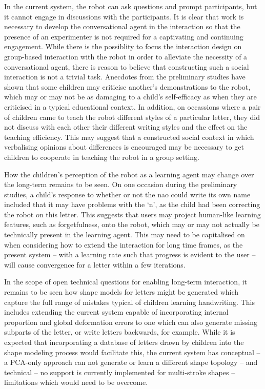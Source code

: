 \documentclass{sig-alternate}
\begin{document}
In the current system, the robot can ask questions and prompt participants, but it 
cannot engage in discussions with the participants. It is clear that work is necessary 
to develop the conversational agent in the interaction so that the presence of an 
experimenter is not required for a captivating and continuing engagement. While there is the 
possiblity to focus the interaction design on group-based interaction with the robot 
in order to alleviate the necessity of a conversational agent, there is reason to 
believe that constructing such a social interaction is not a trivial task. Anecdotes 
from the preliminary studies have shown that some children may criticise another's 
demonstrations to the robot, which may or may not be as damaging to a child's 
self-efficacy as when they are criticised in a typical educational context. In addition,
on occassions where a pair of children came to teach the robot different styles of a 
particular letter, they did not discuss with each other their different writing styles 
and the effect on the teaching efficiency. This may suggest that a constructed social context in 
which verbalising opinions about differences is encouraged may be necessary to get children 
to cooperate in teaching the robot in a group setting.  

How the children's perception of the robot as a learning agent may change over the 
long-term remains to be seen. On one occasion during the preliminary studies, a 
child's response to whether or not the {\sc nao} could write its own name included that it 
may have problems with the `n', as the child had been correcting the robot on this 
letter. This suggests that users may project human-like learning features, such as 
forgetfulness, onto the robot, which may or may not actually be technically present 
in the learning agent. This may need to be capitalised on when considering how to 
extend the interaction for long time frames, as the present system -- with a learning rate 
such that progress is evident to the user -- will cause convergence for a letter within a 
few iterations.

In the scope of open technical questions for enabling long-term interaction, it remains to be seen how shape models
for letters might be generated which capture the full range of mistakes typical
of children learning handwriting. This includes extending the current system capable of
incorporating internal proportion and global deformation errors to one which can
also generate missing subparts of the letter, or write letters backwards, for example. 
While it is expected that incorporating a
database of letters drawn by children into the shape modeling process would
facilitate this, the current system has conceptual -- a PCA-only approach can not
generate or learn a different shape topology -- and technical -- no support is currently implemented for
multi-stroke shapes -- limitations which would need to be overcome.
\end{document}
